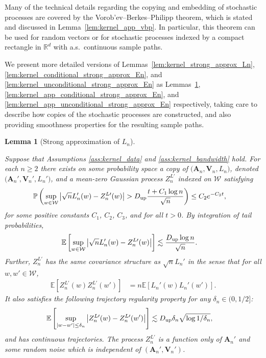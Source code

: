 \documentclass[11pt,lof]{puthesis}
\renewcommand{\P}{\ensuremath{\mathbb{P}}}
\newcommand{\R}{\ensuremath{\mathbb{R}}}
\newcommand{\E}{\ensuremath{\mathbb{E}}}
\newcommand{\bA}{\ensuremath{\mathbf{A}}}
\newcommand{\bV}{\ensuremath{\mathbf{V}}}
\newcommand{\cW}{\ensuremath{\mathcal{W}}}
\newcommand{\Du}{\ensuremath{D_{\textup{up}}}}
\theoremstyle{break}
\newtheorem{lemma}{Lemma}[section]
\theoremstyle{proof}
\begin{document}
Many of the technical details regarding
the copying and embedding of stochastic processes
are covered by the
Vorob'ev--Berkes--Philipp theorem,
which is stated and discussed in
Lemma~\ref{lem:kernel_app_vbp}.
In particular, this theorem can be used
for random vectors or for stochastic processes
indexed by a compact rectangle in $\R^d$
with a.s.\ continuous sample paths.

We present more detailed versions of
Lemmas~\ref{lem:kernel_strong_approx_Ln},
\ref{lem:kernel_conditional_strong_approx_En},
and \ref{lem:kernel_unconditional_strong_approx_En}
as Lemmas~\ref{lem:kernel_app_strong_approx_Ln},
\ref{lem:kernel_app_conditional_strong_approx_En},
and \ref{lem:kernel_app_unconditional_strong_approx_En}
respectively, taking care to describe how copies of
the stochastic processes are constructed,
and also providing smoothness properties for
the resulting sample paths.

\begin{lemma}[Strong approximation of $L_n$]
  \label{lem:kernel_app_strong_approx_Ln}

  Suppose that Assumptions
  \ref{ass:kernel_data}
  and
  \ref{ass:kernel_bandwidth} hold.
  For each $n \geq 2$
  there exists
  on some probability space
  a copy of $\big(\bA_n, \bV_n, L_n\big)$,
  denoted $\big(\bA_n', \bV_n', L_n'\big)$,
  and a mean-zero Gaussian process
  $Z^{L\prime}_n$
  indexed on $\cW$ satisfying
  \begin{align*}
    \P\left(
      \sup_{w \in \cW}
      \big| \sqrt{n} L'_n(w) - Z_n^{L\prime}(w)\big|
      > \Du
      \frac{t + C_1 \log n}{\sqrt{n}}
    \right)
    &\leq C_2 e^{-C_3 t},
  \end{align*}
  for some positive constants
  $C_1$, $C_2$, $C_3$,
  and for all $t > 0$.
  By integration of tail probabilities,
  \begin{align*}
    \E\left[
      \sup_{w \in \cW}
      \big| \sqrt{n} L_n'(w) - Z_n^{L\prime}(w)\big|
    \right]
    &\lesssim
    \frac{\Du \log n}{\sqrt{n}}.
  \end{align*}
  Further,
  $Z_n^{L\prime}$ has the same covariance structure as
  $\sqrt{n} L_n'$ in the sense that for all $w, w' \in \cW$,
  \begin{align*}
    \E\left[
      Z_n^{L\prime}(w)
      Z_n^{L\prime}(w')
    \right]
    &=
    n
    \E\left[
      L_n'(w)
      L_n'(w')
    \right].
  \end{align*}
  It also satisfies the following
  trajectory regularity property
  for any $\delta_n \in (0, 1/2]$:
  \begin{align*}
    \E\left[
      \sup_{|w-w'| \leq \delta_n}
      \big|
      Z_n^{L\prime}(w)
      - Z_n^{L\prime}(w')
      \big|
    \right]
    &\lesssim
    \Du
    \delta_n \sqrt{\log 1/\delta_n},
  \end{align*}
  and has continuous trajectories.
  The process $Z_n^{L\prime}$
  is a function only of $\bA_n'$
  and some random noise
  which is independent of $(\bA_n', \bV_n')$.

\end{lemma}
\end{document}
